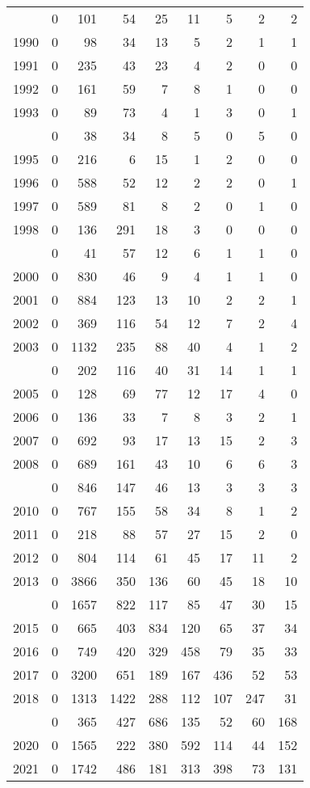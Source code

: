 \documentclass[
]{article}
\begin{document}
\begin{longtable}[t]{lrrrrrrrr}
\endfoot
\bottomrule
\endlastfoot
1989 & 0 & 101 & 54 & 25 & 11 & 5 & 2 & 2\\
1990 & 0 & 98 & 34 & 13 & 5 & 2 & 1 & 1\\
1991 & 0 & 235 & 43 & 23 & 4 & 2 & 0 & 0\\
1992 & 0 & 161 & 59 & 7 & 8 & 1 & 0 & 0\\
1993 & 0 & 89 & 73 & 4 & 1 & 3 & 0 & 1\\
\addlinespace
1994 & 0 & 38 & 34 & 8 & 5 & 0 & 5 & 0\\
1995 & 0 & 216 & 6 & 15 & 1 & 2 & 0 & 0\\
1996 & 0 & 588 & 52 & 12 & 2 & 2 & 0 & 1\\
1997 & 0 & 589 & 81 & 8 & 2 & 0 & 1 & 0\\
1998 & 0 & 136 & 291 & 18 & 3 & 0 & 0 & 0\\
\addlinespace
1999 & 0 & 41 & 57 & 12 & 6 & 1 & 1 & 0\\
2000 & 0 & 830 & 46 & 9 & 4 & 1 & 1 & 0\\
2001 & 0 & 884 & 123 & 13 & 10 & 2 & 2 & 1\\
2002 & 0 & 369 & 116 & 54 & 12 & 7 & 2 & 4\\
2003 & 0 & 1132 & 235 & 88 & 40 & 4 & 1 & 2\\
\addlinespace
2004 & 0 & 202 & 116 & 40 & 31 & 14 & 1 & 1\\
2005 & 0 & 128 & 69 & 77 & 12 & 17 & 4 & 0\\
2006 & 0 & 136 & 33 & 7 & 8 & 3 & 2 & 1\\
2007 & 0 & 692 & 93 & 17 & 13 & 15 & 2 & 3\\
2008 & 0 & 689 & 161 & 43 & 10 & 6 & 6 & 3\\
\addlinespace
2009 & 0 & 846 & 147 & 46 & 13 & 3 & 3 & 3\\
2010 & 0 & 767 & 155 & 58 & 34 & 8 & 1 & 2\\
2011 & 0 & 218 & 88 & 57 & 27 & 15 & 2 & 0\\
2012 & 0 & 804 & 114 & 61 & 45 & 17 & 11 & 2\\
2013 & 0 & 3866 & 350 & 136 & 60 & 45 & 18 & 10\\
\addlinespace
2014 & 0 & 1657 & 822 & 117 & 85 & 47 & 30 & 15\\
2015 & 0 & 665 & 403 & 834 & 120 & 65 & 37 & 34\\
2016 & 0 & 749 & 420 & 329 & 458 & 79 & 35 & 33\\
2017 & 0 & 3200 & 651 & 189 & 167 & 436 & 52 & 53\\
2018 & 0 & 1313 & 1422 & 288 & 112 & 107 & 247 & 31\\
\addlinespace
2019 & 0 & 365 & 427 & 686 & 135 & 52 & 60 & 168\\
2020 & 0 & 1565 & 222 & 380 & 592 & 114 & 44 & 152\\
2021 & 0 & 1742 & 486 & 181 & 313 & 398 & 73 & 131\\*
\end{longtable}
\end{document}
